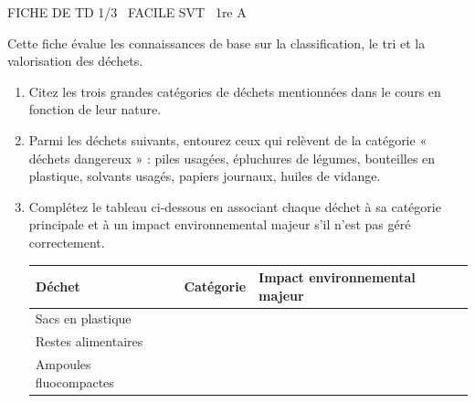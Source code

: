 \documentclass[11pt]{article}
\begin{document}
\begin{tcolorbox}[enhanced,colback=popink,colframe=popink,arc=10pt,boxrule=0pt,left=12pt,right=12pt,top=9pt,bottom=9pt]
{\color{white}\popxbold\small FICHE DE TD 1/3 \textbullet\ FACILE \hfill SVT \textbullet\ 1re A\par}
\end{tcolorbox}
\vspace{4pt}
Cette fiche évalue les connaissances de base sur la classification, le tri et la valorisation des déchets.

\begin{exercice}
\begin{enumerate}
    \item Citez les trois grandes catégories de déchets mentionnées dans le cours en fonction de leur nature.
    \item Parmi les déchets suivants, entourez ceux qui relèvent de la catégorie « déchets dangereux » : piles usagées, épluchures de légumes, bouteilles en plastique, solvants usagés, papiers journaux, huiles de vidange.
    \item Complétez le tableau ci-dessous en associant chaque déchet à sa catégorie principale et à un impact environnemental majeur s'il n'est pas géré correctement.
    
    \begin{tabular}{|p{3.5cm}|p{3.5cm}|p{6cm}|}
    \hline
    \textbf{Déchet} & \textbf{Catégorie} & \textbf{Impact environnemental majeur} \\
    \hline
    Sacs en plastique &  &  \\
    \hline
    Restes alimentaires &  &  \\
    \hline
    Ampoules fluocompactes &  &  \\
    \hline
    \end{tabular}
\end{enumerate}
\end{exercice}
\end{document}

